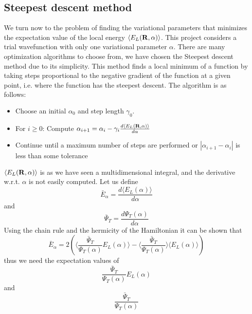 \documentclass[english, a4paper]{article}
\begin{document}
\subsection*{Steepest descent method}

We turn now to the problem of finding the variational parameters that minimizes the expectation value
of the local energy $\langle E_L({\bf R}, \alpha) \rangle$. This project considers a trial wavefunction with only one 
variational parameter $\alpha$.
There are many optimization algorithms to choose from, we have chosen the Steepest 
descent method due to its simplicity. This method finds a local minimum of a function by taking steps proportional 
to the negative gradient of the function at a given point, i.e. where the function has the steepest descent.
The algorithm is as follows:
\begin{itemize}
 \item Choose an initial $\alpha_0$ and step length $\gamma_0$.
 \item For $i \geq 0$: Compute $\alpha_{i+1} = \alpha_i - \gamma_i \frac{d \langle E_L({\bf R}, \alpha) \rangle}{d\alpha}$
 \item Continue until a maximum number of steps are performed or $|\alpha_{i+1} - \alpha_{i}|$ is 
       less than some tolerance
\end{itemize}
$\langle E_L({\bf R}, \alpha) \rangle$ is as we have seen a multidimensional integral, and the derivative w.r.t. $\alpha$
is not easily computed. Let us define
\begin{equation}
 \bar{E}_\alpha = \frac{d \langle E_L(\alpha) \rangle}{d\alpha}
\end{equation}
and 
\begin{equation}
 \bar{\Psi}_T = \frac{d \Psi_T(\alpha)}{d\alpha}
\end{equation}
Using the chain rule and the hermicity of the Hamiltonian it can be shown that
\begin{equation}
 \bar{E}_\alpha = 2 \left( \Bigr\langle \frac{\bar{\Psi}_T}{\Psi_T(\alpha)} E_L(\alpha) \Bigr\rangle 
 - \Bigr\langle \frac{\bar{\Psi}_T}{\Psi_T(\alpha)}\Bigr\rangle \langle E_L(\alpha) \rangle   \right)
 \label{localenergyalpha}
\end{equation}
thus we need the expectation values of
\begin{equation}
 \frac{\bar{\Psi}_T}{\Psi_T(\alpha)} E_L(\alpha)
 \label{waveenergy}
\end{equation}
and 
\begin{equation}
 \frac{\bar{\Psi}_T}{\Psi_T(\alpha)}
 \label{wavederivative}
\end{equation}
\end{document}
